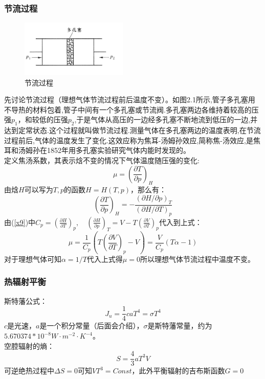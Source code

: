 \documentclass[12pt]{article}
\begin{document}
\subsubsection{节流过程}
\begin{figure}
	\begin{center}
		\includegraphics[width=2in]{F4.png}
		\caption{节流过程}
		\label{F4}
	\end{center}
\end{figure}
先讨论节流过程（理想气体节流过程前后温度不变）。如图2.1所示,管子多孔塞用不导热的材料包着,管子中间有一个多孔塞或节流阀.多孔塞两边各维持着较高的压强$p_1$，和较低的压强$p_2$,于是气体从高压的一边经多孔塞不断地流到低压的一边,并达到定常状态.这个过程就叫做节流过程.测量气体在多孔塞两边的温度表明,在节流过程前后,气体的温度发生了变化.这效应称为焦耳-汤姆孙效应,简称焦-汤效应,是焦耳和汤姆孙在1852年用多孔塞实验研究气体内能时发现的。\\
定义焦汤系数，其表示焓不变的情况下气体温度随压强的变化:
\begin{equation}
	\mu=(\frac{\partial T}{\partial p})_H
\end{equation}
由焓$H$可以写为$T,p$的函数$H=H(T,p)$，那么有：
\begin{equation}
	(\frac{\partial T}{\partial p})_H=-\frac{(\partial H/\partial p)_T}{(\partial H/\partial T)_p}
\end{equation}
由(\ref{x9})中$	{{C}_{p}}=(\frac{\partial H}{\partial T})_p,\quad 
	{{(\frac{\partial H}{\partial p})}_{T}}=V-T{{(\frac{\partial V}{\partial T})}_{p}} $代入到上式：
\begin{equation}
	\mu=\frac{1}{C_p}(T(\frac{\partial V}{\partial T})_p-V)=\frac{V}{C_p}(T\alpha-1)
\end{equation}
对于理想气体可知$\alpha=1/T$代入上式得$\mu=0$所以理想气体节流过程中温度不变。
\subsubsection{热辐射平衡}
\noindent
斯特藩公式：
\begin{equation}
	J_u=\frac{1}{4}caT^4=\sigma T^4
	\label{x48}
\end{equation}
$c$是光速，$a$是一个积分常量（后面会介绍），$\sigma$是斯特藩常量，约为$5.670374*10^{-8}W\cdot m^{-2} \cdot K^{-4}$。\\
空腔辐射的熵：
\begin{equation}
	S=\frac{4}{3}aT^3V
\end{equation}
可逆绝热过程中$\Delta S=0$可知$VT^3=Const$，此外平衡辐射的吉布斯函数$G=0$
\end{document}
